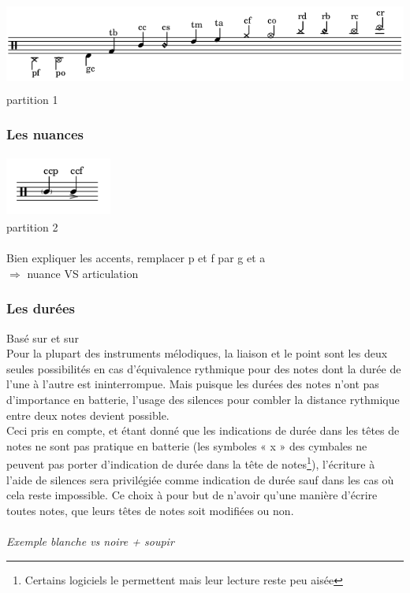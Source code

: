 \includegraphics[height=30mm, width=155mm]{z_images/1_description_notation/notes.png}
partition 1
\subsubsection{Les nuances}
\includegraphics[height=20mm, width=35mm]{z_images/1_description_notation/nuances.png}\\
partition 2\\\\
Bien expliquer les accents, remplacer p et f par g et a\\
$\Rightarrow$ nuance VS articulation\

\subsubsection{Les durées}
Basé sur \cite{jacquemard:hal-01134096} et sur \cite{jacquemard:hal-01403982}\\
Pour la plupart des instruments mélodiques, la liaison et le point sont les deux seules possibilités en cas d’équivalence rythmique pour des notes dont la durée de l’une à l’autre est ininterrompue. Mais puisque les durées des notes n’ont pas d’importance en batterie, l’usage des silences pour combler la distance rythmique entre deux notes devient possible.\\
Ceci pris en compte, et étant donné que les indications de durée dans les têtes de notes ne sont pas pratique en batterie (les symboles « x » des cymbales ne
peuvent pas porter d’indication de durée dans la tête de notes\footnote{Certains logiciels le permettent mais leur lecture reste peu aisée}), l’écriture à l’aide de silences sera privilégiée comme indication de durée sauf dans les cas où cela reste impossible. Ce choix à pour but de n’avoir qu’une manière d’écrire toutes notes, que leurs têtes de notes soit modifiées ou non.\\\\
\textit{Exemple blanche vs noire + soupir}\\

